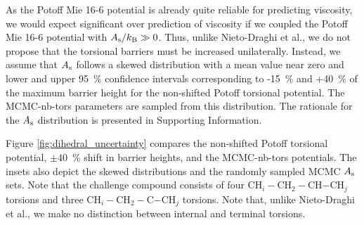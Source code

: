 \documentclass[preprint,review,12pt]{elsarticle}
\begin{document}
	
	As the Potoff Mie 16-6 potential is already quite reliable for predicting viscosity, we would expect significant over prediction of viscosity if we coupled the Potoff Mie 16-6 potential with $A_{\rm s}/k_{\rm B} \gg 0 $. Thus, unlike Nieto-Draghi et al., we do not propose that the torsional barriers must be increased unilaterally. Instead, we assume that $A_{\rm s}$ follows a skewed distribution with a mean value near zero and lower and upper 95~\% confidence intervals corresponding to -15~\% and +40~\% of the maximum barrier height for the non-shifted Potoff torsional potential. The MCMC-nb-tors parameters are sampled from this distribution. The rationale for the $A_{\rm s}$ distribution is presented in Supporting Information. 
	
	
	Figure \ref{fig:dihedral_uncertainty} compares the non-shifted Potoff torsional potential, $\pm 40$~\% shift in barrier heights, and the MCMC-nb-tors potentials. The insets also depict the skewed distributions and the randomly sampled MCMC $A_{\rm s}$ sets. Note that the challenge compound consists of four CH$_i-$CH$_2-$CH$-$CH$_j$ torsions and three CH$_i-$CH$_2-$C$-$CH$_j$ torsions. Note that, unlike Nieto-Draghi et al., we make no distinction between internal and terminal torsions. 
	
	
	
\end{document}
